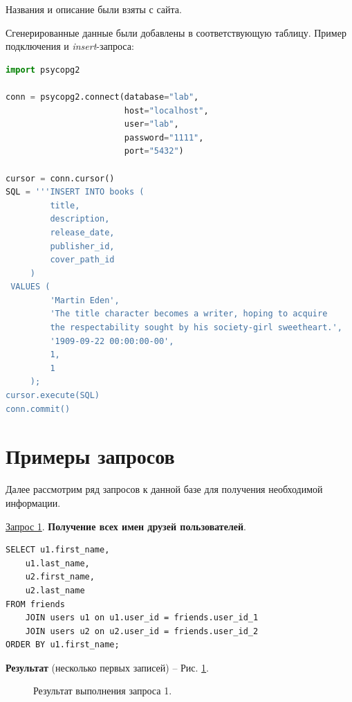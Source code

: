 \documentclass[a4paper,12pt]{article}
\begin{document}
Названия и описание были взяты с сайта.

Сгенерированные данные были добавлены в соответствующую таблицу. Пример подключения и \emph{insert}-запроса:
\begin{lstlisting}[language=Python]
import psycopg2

conn = psycopg2.connect(database="lab",
                        host="localhost",
                        user="lab",
                        password="1111",
                        port="5432")

cursor = conn.cursor()
SQL = '''INSERT INTO books (
         title,
         description,
         release_date,
         publisher_id,
         cover_path_id
     )
 VALUES (
         'Martin Eden',
         'The title character becomes a writer, hoping to acquire 
         the respectability sought by his society-girl sweetheart.',
         '1909-09-22 00:00:00-00',
         1,
         1
     );
cursor.execute(SQL)
conn.commit()
    \end{lstlisting}


\newpage
\section{Примеры запросов}
Далее рассмотрим ряд запросов к данной базе для получения необходимой информации.

\underline{Запрос 1}. \textbf{Получение всех имен друзей пользователей}.
\begin{lstlisting}
SELECT u1.first_name,
    u1.last_name,
    u2.first_name,
    u2.last_name
FROM friends
    JOIN users u1 on u1.user_id = friends.user_id_1
    JOIN users u2 on u2.user_id = friends.user_id_2
ORDER BY u1.first_name;
    \end{lstlisting}

\textbf{Результат} (несколько первых записей) -- Рис. \ref{fig:request1}.

\begin{figure}[ht]
    \caption{Результат выполнения запроса 1.}
    \label{fig:request1}
\end{figure}
\end{document}
